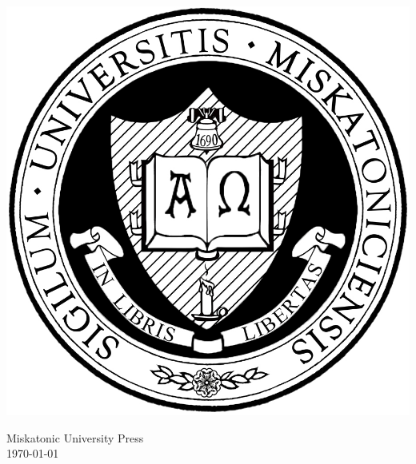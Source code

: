 \begin{titlepage}
\begin{center}
{} \\
\vspace{0.5cm}
\Large\textbf{\pdftitle} \\
\setmainfont{Times New Roman}
\large\pdfauthor

\vfill

\includegraphics[scale=.2]{miskatonic-university.jpg}

\vfill

\Large
Miskatonic University Press \\
\small
{}
\today
\end{center}
\end{titlepage}
